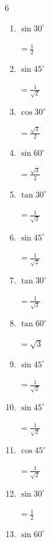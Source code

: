 \begin{multicols}{6}
\begin{enumerate}
        $\displaystyle =\frac{1}{2}$

  \item $\displaystyle \sin{30^\circ}$

        $\displaystyle =\frac{1}{2}$

  \item $\displaystyle \sin{45^\circ}$

        $\displaystyle =\frac{1}{\sqrt{2}}$

  \item $\displaystyle \cos{30^\circ}$

        $\displaystyle =\frac{\sqrt{3}}{2}$

  \item $\displaystyle \sin{60^\circ}$

        $\displaystyle =\frac{\sqrt{3}}{2}$

  \item $\displaystyle \tan{30^\circ}$

        $\displaystyle =\frac{1}{\sqrt{3}}$

  \item $\displaystyle \sin{45^\circ}$

        $\displaystyle =\frac{1}{\sqrt{2}}$

  \item $\displaystyle \tan{30^\circ}$

        $\displaystyle =\frac{1}{\sqrt{3}}$

  \item $\displaystyle \tan{60^\circ}$

        $\displaystyle =\sqrt{3}$

  \item $\displaystyle \sin{45^\circ}$

        $\displaystyle =\frac{1}{\sqrt{2}}$

  \item $\displaystyle \sin{45^\circ}$

        $\displaystyle =\frac{1}{\sqrt{2}}$

  \item $\displaystyle \cos{45^\circ}$

        $\displaystyle =\frac{1}{\sqrt{2}}$

\columnbreak %

  \item $\displaystyle \sin{30^\circ}$

        $\displaystyle =\frac{1}{2}$

  \item $\displaystyle \sin{60^\circ}$


\end{enumerate}
\end{multicols}
